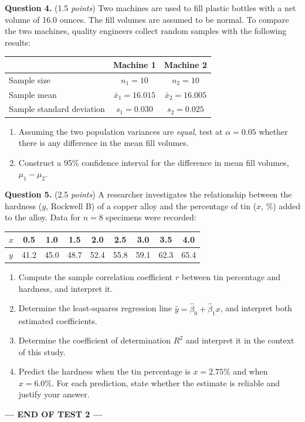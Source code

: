 \documentclass[12pt]{article}
\begin{document}
\textbf{Question 4.} (1.5 \emph{points})
Two machines are used to fill plastic bottles with a net volume of
16.0 ounces. The fill volumes are assumed to be normal. To compare the
two machines, quality engineers collect random samples with the
following results:
\begin{center}
\begin{tabular}{lcc}
\toprule
 & Machine 1 & Machine 2 \\
\midrule
Sample size                 & $n_1 = 10$   & $n_2 = 10$   \\
Sample mean                 & $\bar{x}_1 = 16.015$ & $\bar{x}_2 = 16.005$ \\
Sample standard deviation   & $s_1 = 0.030$ & $s_2 = 0.025$ \\
\bottomrule
\end{tabular}
\end{center}
\begin{enumerate}[label=(\alph*),leftmargin=*]
  \item Assuming the two population variances are \emph{equal},
        test at $\alpha = 0.05$ whether there is any difference in the
        mean fill volumes.
  \item Construct a 95\% confidence interval for the difference in
        mean fill volumes, $\mu_1 - \mu_2$.
\end{enumerate}

\textbf{Question 5.} (2.5 \emph{points})
A researcher investigates the relationship between the hardness
($y$, Rockwell B) of a copper alloy and the percentage of tin ($x$,
\%) added to the alloy. Data for $n = 8$ specimens were recorded:
\begin{center}
\begin{tabular}{l|cccccccc}
$x$ & 0.5 & 1.0 & 1.5 & 2.0 & 2.5 & 3.0 & 3.5 & 4.0 \\ \hline
$y$ & 41.2 & 45.0 & 48.7 & 52.4 & 55.8 & 59.1 & 62.3 & 65.4 \\
\end{tabular}
\end{center}
\begin{enumerate}[label=(\alph*),leftmargin=*]
  \item Compute the sample correlation coefficient $r$ between
        tin percentage and hardness, and interpret it.
  \item Determine the least-squares regression line
        $\hat{y} = \hat{\beta}_0 + \hat{\beta}_1 x$, and interpret
        both estimated coefficients.
  \item Determine the coefficient of determination $R^{2}$ and
        interpret it in the context of this study.
  \item Predict the hardness when the tin percentage is
        $x = 2.75\%$ and when $x = 6.0\%$. For each prediction,
        state whether the estimate is reliable and justify your
        answer.
\end{enumerate}

\vspace{10pt}
\begin{center}
\textbf{--- END OF TEST 2 ---}
\end{center}
\end{document}
